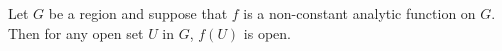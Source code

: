 Let $G$ be a region and suppose that $f$ is a non-constant analytic function on $G$. Then for any open set $U$ in $G$, $f(U)$ is open.
